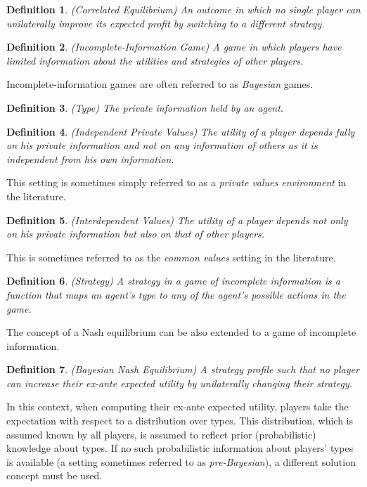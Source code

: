 \documentclass{article}
\newtheorem{definition}{Definition}
\begin{document}
\begin{definition}
(Correlated Equilibrium) An outcome in which no single player can unilaterally improve its expected profit by switching to a different strategy.
\end{definition}

\begin{definition}
(Incomplete-Information Game) A game in which players have limited information about the utilities and strategies of other players.
\end{definition}

Incomplete-information games are often referred to as \textit{Bayesian} games.

\begin{definition}
(Type) The private information held by an agent.
\end{definition}

\begin{definition}
(Independent Private Values) The utility of a player depends fully on his private information and not on any information of others as it is independent from his own information.
\end{definition}

This setting is sometimes simply referred to as a \textit{private values environment} in the literature.

\begin{definition}
(Interdependent Values) The utility of a player depends not only on his private information but also on that of other players.
\end{definition}

This is sometimes referred to as the \textit{common values} setting in the literature.

\begin{definition}
(Strategy) A strategy in a game of incomplete information is a function that maps an agent's type to
any of the agent's possible actions in the game.
\end{definition}

The concept of a Nash equilibrium can be also extended to a game of incomplete information.

\begin{definition}
(Bayesian Nash Equilibrium) A strategy profile such that no player can increase their ex-ante expected utility by unilaterally changing their strategy.
\end{definition}

In this context, when computing their ex-ante expected utility, players take the expectation with respect to a distribution over types. This distribution, which is assumed known by all players, is assumed to reflect prior (probabilistic) knowledge about types. If no such probabilistic information about players' types is available (a setting sometimes referred to as \textit{pre-Bayesian}), a different solution concept must be used. 
\end{document}
